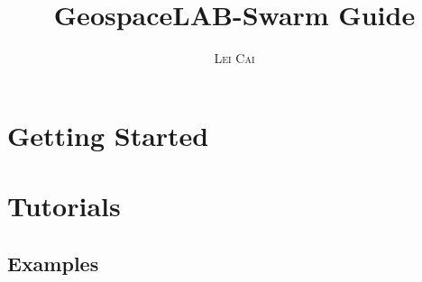 \documentclass[a4paper,11pt,oneside]{book}
\title{\Huge \textbf{GeospaceLAB-Swarm Guide}}
\author{\textsc{Lei Cai}}
\begin{document}
\sloppy

\frontmatter
\maketitle

\tableofcontents

\mainmatter

% 
% 

\section{Getting Started}









\section{Tutorials}











\subsection{Examples}















\end{document}
